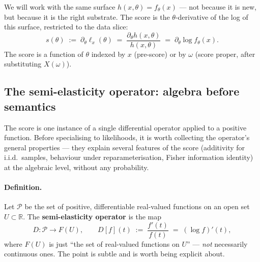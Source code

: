 \documentclass[a4paper,oneside,12pt]{extarticle}
\theoremstyle{plain}
\theoremstyle{definition}
\theoremstyle{remark}
\begin{document}
We will work with the same surface $h(x,\theta) = f_\theta(x)$ ---
not because it is new, but because it is the right substrate.  The
score is the $\theta$-derivative of the log of this surface,
restricted to the data slice:
\[
  s(\theta) \;:=\; \partial_\theta \ell_x(\theta)
  \;=\; \frac{\partial_\theta h(x,\theta)}{h(x,\theta)}
  \;=\; \partial_\theta \log f_\theta(x).
\]
The score is a function of $\theta$ indexed by $x$ (pre-score) or by
$\omega$ (score proper, after substituting $X(\omega)$).

\subsection{The semi-elasticity operator: algebra before semantics}
\label{sec:semi_elasticity_operator}

The score is one instance of a single differential operator applied
to a positive function.  Before specialising to likelihoods, it is
worth collecting the operator's general properties --- they explain
several features of the score (additivity for i.i.d.\ samples,
behaviour under reparameterisation, Fisher information identity) at
the algebraic level, without any probability.

\paragraph{Definition.}
Let $\mathcal{P}$ be the set of positive, differentiable real-valued
functions on an open set $U \subset \mathbb{R}$.  The
\textbf{semi-elasticity operator} is the map
\[
  D: \mathcal{P} \longrightarrow F(U),
  \qquad
  D[f](t) \;:=\; \frac{f'(t)}{f(t)} \;=\; (\log f)'(t),
\]
where $F(U)$ is just ``the set of real-valued functions on $U$'' ---
\emph{not} necessarily continuous ones.  The point is subtle and is
worth being explicit about.
\end{document}
